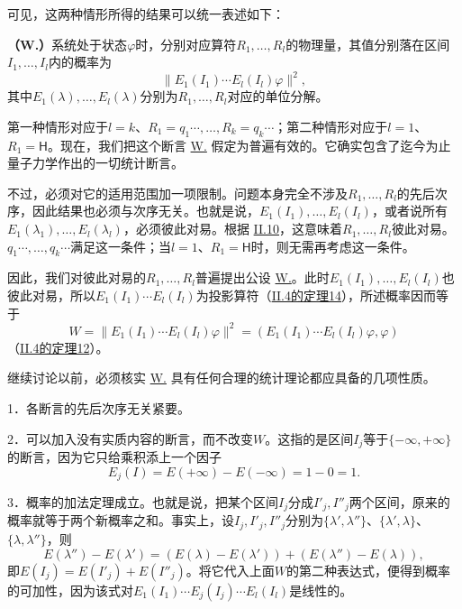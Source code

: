 \documentclass[fontsize=13pt,twoside,openany,headings=normal,parskip=false,bookmarkpackage=false,DIV=calc]{scrbook}
\begin{document}
\hypertarget{origpage-104}{}\label{origpage-104}可见，这两种情形所得的结果可以统一表述如下：

\leavevmode{}\label{post:III.1.W}\textbf{（W.）}系统处于状态$\varphi$时，分别对应算符$R_1,\allowbreak \ldots,\allowbreak R_l$的物理量，其值分别落在区间$I_1,\allowbreak \ldots,\allowbreak I_l$内的概率为
\[
\|E_1(I_1)\cdots E_l(I_l)\varphi\|^2,
\]
其中$E_1(\lambda),\allowbreak \ldots,\allowbreak E_l(\lambda)$分别为$R_1,\allowbreak \ldots,\allowbreak R_l$对应的单位分解。

第一种情形对应于$l=k$、$R_1=q_1\cdots,\allowbreak \ldots,\allowbreak R_k=q_k\cdots$；第二种情形对应于$l=1$、$R_1=\mathsf H$。现在，我们把这个断言 \hyperref[post:III.1.W]{W.} 假定为普遍有效的。它确实包含了迄今为止量子力学作出的一切统计断言。

不过，必须对它的适用范围加一项限制。问题本身完全不涉及$R_1,\allowbreak \ldots,\allowbreak R_l$的先后次序，因此结果也必须与次序无关。也就是说，$E_1(I_1),\allowbreak \ldots,\allowbreak E_l(I_l)$，或者说所有$E_1(\lambda_1),\allowbreak \ldots,\allowbreak E_l(\lambda_l)$，必须彼此对易。根据 \hyperref[sec:II.10]{II.10}，这意味着$R_1,\allowbreak \ldots,\allowbreak R_l$彼此对易。$q_1\cdots,\allowbreak \ldots,\allowbreak q_k\cdots$满足这一条件；当$l=1$、$R_1=\mathsf H$时，则无需再考虑这一条件。

因此，我们对彼此对易的$R_1,\allowbreak \ldots,\allowbreak R_l$普遍提出公设 \hyperref[post:III.1.W]{W.}。此时$E_1(I_1),\allowbreak \ldots,\allowbreak E_l(I_l)$也彼此对易，所以$E_1(I_1)\cdots E_l(I_l)$为投影算符（\hyperref[thm:II.14]{II.4的定理14}），所述概率因而等于
\[
W=\|E_1(I_1)\cdots E_l(I_l)\varphi\|^2
=(E_1(I_1)\cdots E_l(I_l)\varphi,\varphi)
\]
（\hyperref[thm:II.12]{II.4的定理12}）。

继续讨论以前，必须核实 \hyperref[post:III.1.W]{W.} 具有任何合理的统计理论都应具备的几项性质。

1．各断言的先后次序无关紧要。

2．可以加入没有实质内容的断言，而不改变$W$。这指的是区间$I_j$等于$\{-\infty,\allowbreak +\infty\}$的断言，因为它只给乘积添上一个因子
\[
E_j(I)=E(+\infty)-E(-\infty)=1-0=1.
\]

3．概率的加法定理成立。也就是说，把某个区间$I_j$分成$I'_j,\allowbreak I''_j$两个区间，原来的概率就等于两个新概率之和。事实上，设$I_j,\allowbreak I'_j,\allowbreak I''_j$分别为$\{\lambda',\allowbreak \lambda''\}$、$\{\lambda',\allowbreak \lambda\}$、$\{\lambda,\allowbreak \lambda''\}$，则
\[
E(\lambda'')-E(\lambda')=(E(\lambda)-E(\lambda'))+(E(\lambda'')-E(\lambda)),
\]
即$E(I_j)=E(I'_j)+E(I''_j)$。将它代入上面$W$的第二种表达式，便得到概率的可加性，因为该式对$E_1(I_1)\cdots E_j(I_j)\cdots E_l(I_l)$是线性的。
\end{document}
